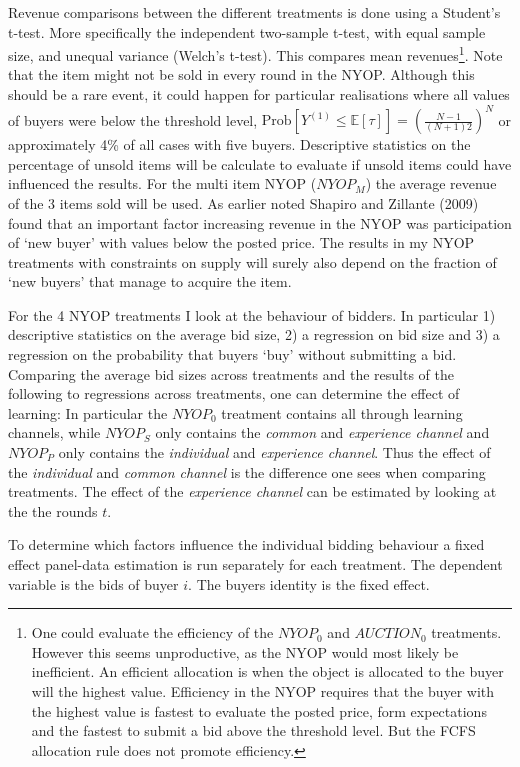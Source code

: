 \documentclass[a4paper,12pt]{article}
\begin{document}
	Revenue comparisons between the different treatments is done using a Student's t-test. More specifically the independent two-sample t-test, with equal sample size, and unequal variance (Welch's t-test). This compares mean revenues\footnote{\label{footnote:efficient}One could evaluate the efficiency of the $NYOP_0$ and $AUCTION_0$ treatments. However this seems unproductive, as the NYOP would most likely be inefficient. An efficient allocation is when the object is allocated to the buyer will the highest value. Efficiency in the NYOP requires that the buyer with the highest value is fastest to evaluate the posted price, form expectations and the fastest to submit a bid above the threshold level. But the FCFS allocation rule does not promote efficiency.}. Note that the item might not be sold in every round in the NYOP. Although this should be a rare event, it could happen for particular realisations where all values of buyers were below the threshold level, $\mbox{Prob}[Y^{(1)} \le \mathbb{E}[\tau]] = \left(\frac{N-1}{(N+1)2}\right)^N$ or approximately 4\% of all cases with five buyers. Descriptive statistics on the percentage of unsold items will be calculate to evaluate if unsold items could have influenced the results. For the multi item NYOP ($NYOP_M$) the average revenue of the 3 items sold will be used. As earlier noted Shapiro and Zillante (2009) found that an important factor increasing revenue in the NYOP was participation of `new buyer' with values below the posted price. The results in my NYOP treatments with constraints on supply will surely also depend on the fraction of `new buyers' that manage to acquire the item.

	For the 4 NYOP treatments I look at the behaviour of bidders. In particular 1) descriptive statistics on the average bid size, 2) a regression on bid size and 3) a regression on the probability that buyers `buy' without submitting a bid. Comparing the average bid sizes across treatments and the results of the following to regressions across treatments, one can determine the effect of learning: In particular the $NYOP_0$ treatment contains all through learning channels, while $NYOP_S$ only contains the \emph{common} and \emph{experience channel} and $NYOP_P$ only contains the \emph{individual} and \emph{experience channel}. Thus the effect of the \emph{individual} and \emph{common channel} is the difference one sees when comparing treatments. The effect of the \emph{experience channel} can be estimated by looking at the the rounds $t$.

	To determine which factors influence the individual bidding behaviour a fixed effect panel-data estimation is run separately for each treatment. The dependent variable is the bids of buyer $i$. The buyers identity is the fixed effect.
\end{document}
